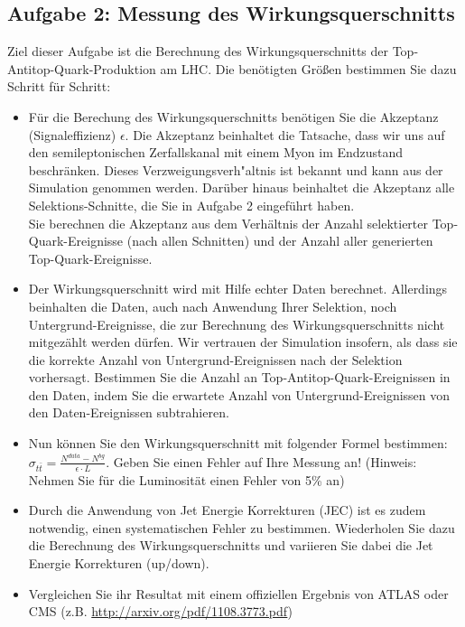 \subsection{Aufgabe 2: Messung des Wirkungsquerschnitts}
Ziel dieser Aufgabe ist die Berechnung des Wirkungsquerschnitts der Top-Antitop-Quark-Produktion am LHC. Die ben\"otigten Gr\"o\ss{}en bestimmen Sie dazu Schritt f\"ur Schritt:
\begin{itemize}
	\item F\"ur die Berechung des Wirkungsquerschnitts ben\"otigen Sie die Akzeptanz (Signaleffizienz) $\epsilon$. Die Akzeptanz beinhaltet die Tatsache, dass wir uns auf den semileptonischen Zerfalls\-kanal mit einem Myon im Endzustand beschr\"anken. Dieses Verzweigungsverh"altnis ist bekannt und kann aus der Simulation genommen werden. Dar\"uber hinaus beinhaltet die Akzeptanz alle Selektions-Schnitte, die Sie in Aufgabe 2 eingef\"uhrt haben. \\Sie berechnen die Akzeptanz aus dem Verh\"altnis der Anzahl selektierter Top-Quark-Ereignisse (nach allen Schnitten) und der Anzahl aller generierten Top-Quark-Er\-eig\-nisse.
	\item Der Wirkungsquerschnitt wird mit Hilfe echter Daten berechnet. Allerdings beinhalten die Daten, auch nach Anwendung Ihrer Selektion, noch Untergrund-Ereignisse, die zur Berechnung des Wirkungsquerschnitts nicht mitgez\"ahlt werden d\"urfen. Wir vertrauen der Simulation insofern, als dass sie die korrekte Anzahl von Untergrund-Ereignissen nach der Selektion vorhersagt. Bestimmen Sie die Anzahl an Top-Antitop-Quark-Ereignissen in den Daten, indem Sie die erwartete Anzahl von Untergrund-Ereignissen von den Daten-Ereignissen subtrahieren.
	\item Nun k\"onnen Sie den Wirkungsquerschnitt mit folgender Formel bestimmen: $\sigma_{t\bar{t}} = \frac{N^{data} - N^{bg}}{\epsilon \cdot L}$. Geben Sie einen Fehler auf Ihre Messung an! (Hinweis: Nehmen Sie f\"ur die Luminosit\"at einen Fehler von 5\% an)
        \item Durch die Anwendung von Jet Energie Korrekturen (JEC) ist es zudem notwendig, einen systematischen Fehler zu bestimmen. Wiederholen Sie dazu die Berechnung des Wirkungsquerschnitts und variieren Sie dabei die Jet Energie Korrekturen (up/down). 
	\item Vergleichen Sie ihr Resultat mit einem offiziellen Ergebnis von ATLAS oder CMS (z.B. \url{http://arxiv.org/pdf/1108.3773.pdf})
\end{itemize}

